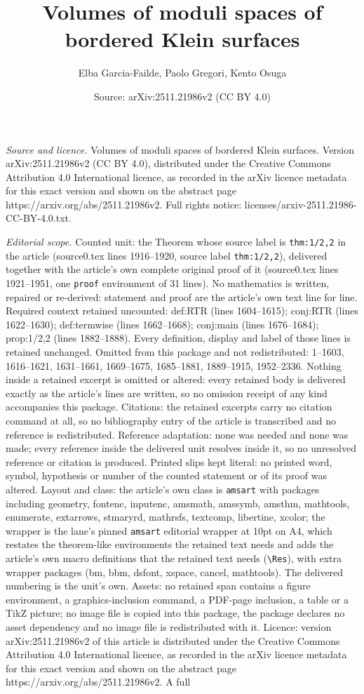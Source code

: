 \documentclass[10pt,a4paper]{amsart}
\title[Volumes of moduli spaces of bordered Klein surfaces]{Volumes of moduli spaces of bordered Klein surfaces}
\author{Elba Garcia-Failde, Paolo Gregori, Kento Osuga}
\date{Source: arXiv:2511.21986v2 (CC BY 4.0)}
\begin{document}
\maketitle

\noindent\emph{Source and licence.} Volumes of moduli spaces of bordered Klein surfaces. Version arXiv:2511.21986v2 (CC BY 4.0), distributed under the Creative Commons Attribution 4.0 International licence, as recorded in the arXiv licence metadata for this exact version and shown on the abstract page https://arxiv.org/abs/2511.21986v2. Full rights notice: licenses/arxiv-2511.21986-CC-BY-4.0.txt.\par\smallskip

\noindent\textit{Editorial scope.} Counted unit: the Theorem whose source label is \texttt{thm:1/2,2} in the article (source0.tex lines 1916--1920, source label \texttt{thm:1/2,2}), delivered together with the article's own complete original proof of it (source0.tex lines 1921--1951, one \texttt{proof} environment of 31 lines). No mathematics is written, repaired or re-derived: statement and proof are the article's own text line for line. Required context retained uncounted: def:RTR (lines 1604--1615); conj:RTR (lines 1622--1630); def:termwise (lines 1662--1668); conj:main (lines 1676--1684); prop:1/2,2 (lines 1882--1888). Every definition, display and label of those lines is retained unchanged. Omitted from this package and not redistributed: 1--1603, 1616--1621, 1631--1661, 1669--1675, 1685--1881, 1889--1915, 1952--2336. Nothing inside a retained excerpt is omitted or altered: every retained body is delivered exactly as the article's lines are written, so no omission receipt of any kind accompanies this package. Citations: the retained excerpts carry no citation command at all, so no bibliography entry of the article is transcribed and no reference is redistributed. Reference adaptation: none was needed and none was made; every reference inside the delivered unit resolves inside it, so no unresolved reference or citation is produced. Printed slips kept literal: no printed word, symbol, hypothesis or number of the counted statement or of its proof was altered. Layout and class: the article's own class is \texttt{amsart} with packages including geometry, fontenc, inputenc, amsmath, amssymb, amsthm, mathtools, enumerate, extarrows, stmaryrd, mathrsfs, textcomp, libertine, xcolor; the wrapper is the lane's pinned \texttt{amsart} editorial wrapper at 10pt on A4, which restates the theorem-like environments the retained text needs and adds the article's own macro definitions that the retained text needs (\texttt{\textbackslash Res}), with extra wrapper packages (bm, bbm, dsfont, xspace, cancel, mathtools). The delivered numbering is the unit's own. Assets: no retained span contains a figure environment, a graphics-inclusion command, a PDF-page inclusion, a table or a TikZ picture; no image file is copied into this package, the package declares no asset dependency and no image file is redistributed with it. Licence: version arXiv:2511.21986v2 of this article is distributed under the Creative Commons Attribution 4.0 International licence, as recorded in the arXiv licence metadata for this exact version and shown on the abstract page https://arxiv.org/abs/2511.21986v2. A full 
\end{document}
